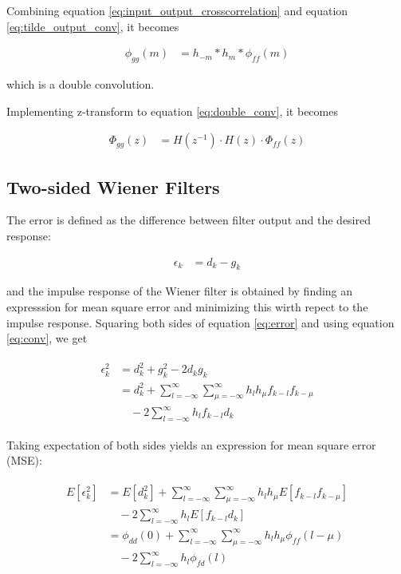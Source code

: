 \documentclass[8pt,a4paper]{article}
\begin{document}
\begin{multicols}{2}
Combining equation \ref{eq:input_output_crosscorrelation} and equation \ref{eq:tilde_output_conv}, it becomes 

\begin{align}
  \label{eq:double_conv}
  \phi_{gg}(m) &= h_{-m} * h_{m} * \phi_{ff}(m)
\end{align}

which is a double convolution.

Implementing z-transform to equation \ref{eq:double_conv}, it becomes

\begin{align}
  \Phi_{gg}(z) &= H(z^{-1}) \cdot H(z) \cdot \Phi_{ff}(z)
\end{align}


\subsection*{Two-sided Wiener Filters}

The error is defined as the difference between filter output and the desired response:

\begin{align}
  \label{eq:error}
  \epsilon_{k} &= d_{k} - g_{k}
\end{align}

and the impulse response of the Wiener filter is obtained by finding an expresssion for mean square error and minimizing this wirth repect to the impulse response. 
Squaring both sides of equation \ref{eq:error} and using equation \ref{eq:conv}, we get

\begin{align}
  \begin{split}
    \epsilon_{k}^{2}&= d_{k}^{2} + g_{k}^{2} -2d_{k}g_{k} \\
    &= d_{k}^{2} + \sum_{l=-\infty}^{\infty} \sum_{\mu=-\infty}^{\infty} h_{l}h_{\mu}f_{k-l}f_{k-\mu} \\ 
    &\quad -2 \sum_{l=-\infty}^{\infty} h_{l}f_{k-l}d_{k}
  \end{split}
\end{align}

Taking expectation of both sides yields an expression for mean square error (MSE):

\begin{align}
  \begin{split}
      E \left[ \epsilon_{k}^{2} \right] &= E \left[ d_{k}^{2} \right] + \sum_{l=-\infty}^{\infty} \sum_{\mu=-\infty}^{\infty} h_{l} h_{\mu}  E \left[ f_{k-l} f_{k-\mu} \right] \\ 
      &\quad  -2 \sum_{l=-\infty}^{\infty} h_{l} E \left[ f_{k-l} d_{k}  \right] \\
      &= \phi_{dd}(0) + \sum_{l=-\infty}^{\infty} \sum_{\mu=-\infty}^{\infty} h_{l}h_{\mu} \phi_{ff}(l-\mu) \\
      &\quad  -2 \sum_{l=-\infty}^{\infty} h_{l}\phi_{fd}(l)
  \end{split}
\end{align}


\end{multicols}
\end{document}
